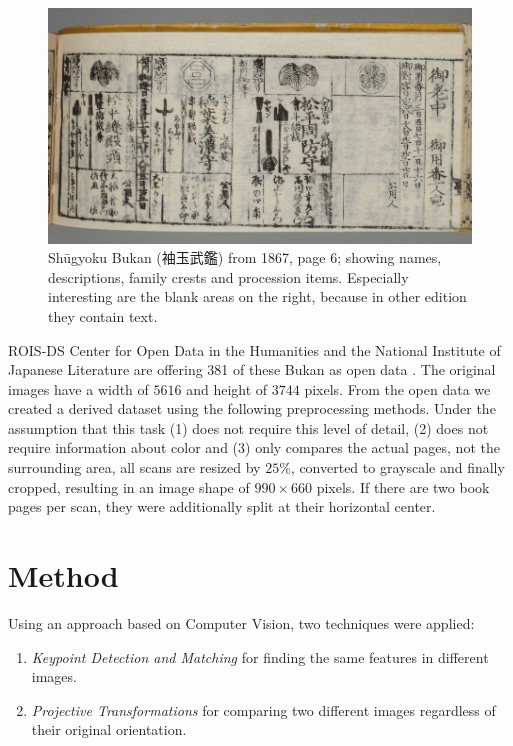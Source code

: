 \documentclass{ltjarticle}
\begin{document}
\begin{figure}
    \centering
    \includegraphics[width=\textwidth]{200019649_00006}
    \caption[Shūgyoku Bukan (袖玉武鑑), page 6]{Shūgyoku Bukan (袖玉武鑑) from 1867, page 6; showing names, descriptions, family crests and procession items. Especially interesting are the blank areas on the right, because in other edition they contain text.}
    \label{fig:shuugyokubukan006}
\end{figure}

ROIS-DS Center for Open Data in the Humanities and the National Institute of Japanese Literature are offering 381 of these Bukan as open data \cite{codh2018bukan}. The original images have a width of $5616$ and height of $3744$ pixels. From the open data we created a derived dataset using the following preprocessing methods. Under the assumption that this task (1) does not require this level of detail, (2) does not require information about color and (3) only compares the actual pages, not the surrounding area, all scans are resized by $25\%$, converted to grayscale and finally cropped, resulting in an image shape of $990 \times 660$ pixels. If there are two book pages per scan, they were additionally split at their horizontal center.

\section{Method}

Using an approach based on Computer Vision, two techniques were applied:

\begin{enumerate}
    \item \emph{Keypoint Detection and Matching} for finding the same features in different images.
    \item \emph{Projective Transformations} for comparing two different images regardless of their original orientation.
\end{enumerate}
\end{document}
